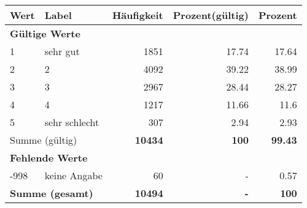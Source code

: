      \begin{longtable}{lXrrr}
     \toprule
     \textbf{Wert} & \textbf{Label} & \textbf{Häufigkeit} & \textbf{Prozent(gültig)} & \textbf{Prozent} \\
     \endhead
     \midrule
     \multicolumn{5}{l}{\textbf{Gültige Werte}}\\

     1 &
     \multicolumn{1}{X}{ sehr gut   } &


       \num{1851} &
       \num[round-mode=places,round-precision=2]{17,74} &
         \num[round-mode=places,round-precision=2]{17,64} \\

     2 &
     \multicolumn{1}{X}{ 2   } &


       \num{4092} &
       \num[round-mode=places,round-precision=2]{39,22} &
         \num[round-mode=places,round-precision=2]{38,99} \\

     3 &
     \multicolumn{1}{X}{ 3   } &


       \num{2967} &
       \num[round-mode=places,round-precision=2]{28,44} &
         \num[round-mode=places,round-precision=2]{28,27} \\

     4 &
     \multicolumn{1}{X}{ 4   } &


       \num{1217} &
       \num[round-mode=places,round-precision=2]{11,66} &
         \num[round-mode=places,round-precision=2]{11,6} \\

     5 &
     \multicolumn{1}{X}{ sehr schlecht   } &


       \num{307} &
       \num[round-mode=places,round-precision=2]{2,94} &
         \num[round-mode=places,round-precision=2]{2,93} \\
     \midrule
     \multicolumn{2}{l}{Summe (gültig)} &
       \textbf{\num{10434}} &
     \textbf{100} &
       \textbf{\num[round-mode=places,round-precision=2]{99,43}} \\
     \multicolumn{5}{l}{\textbf{Fehlende Werte}}\\
       -998 &
       keine Angabe &
         \num{60} &
        - &
         \num[round-mode=places,round-precision=2]{0,57} \\
     \midrule
     \multicolumn{2}{l}{\textbf{Summe (gesamt)}} &
          \textbf{\num{10494}} &
        \textbf{-} &
        \textbf{100} \\
     \bottomrule
     \end{longtable}
     
